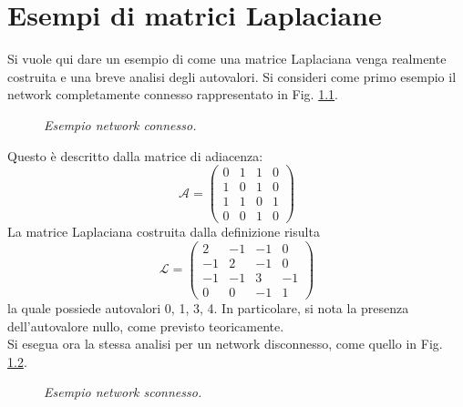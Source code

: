 \documentclass[../main.tex]{subfiles}
\begin{document}
\chapter{Esempi di matrici Laplaciane}
\label{appendix:laplacian}
Si vuole qui dare un esempio di come una matrice Laplaciana venga realmente costruita e una breve analisi degli autovalori.
Si consideri come primo esempio il network completamente connesso rappresentato in Fig. \ref{fig:network_connesso}.
\begin{figure}[H]
    \centering
    \caption[Grafo di un network connesso]{\emph{Esempio network connesso.}}
    \label{fig:network_connesso}
\end{figure}
Questo \`e descritto dalla matrice di adiacenza:
\begin{equation}
    \mathcal{A}=\left(
    \begin{matrix}
        0 & 1 & 1 & 0\\
        1 & 0 & 1 & 0\\
        1 & 1 & 0 & 1\\
        0 & 0 & 1 & 0
    \end{matrix}\right)
\end{equation}
La matrice Laplaciana costruita dalla definizione risulta
\begin{equation}
    \mathcal{L}=\left(
    \begin{matrix}
        2 & -1 & -1 & 0\\
        -1 & 2 & -1 & 0\\
        -1 & -1 & 3 & -1\\
        0 & 0 & -1 & 1
    \end{matrix}\right)
\end{equation}
la quale possiede autovalori 0, 1, 3, 4.
In particolare, si nota la presenza dell'autovalore nullo, come previsto teoricamente.\\
Si esegua ora la stessa analisi per un network disconnesso, come quello in Fig. \ref{fig:network_sconnesso}.
\begin{figure}[H]
    \centering
    \caption[Grafo di un network sconnesso]{\emph{Esempio network sconnesso.}}
    \label{fig:network_sconnesso}
\end{figure}
\end{document}
